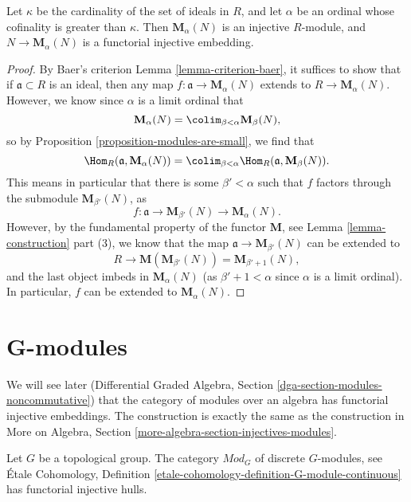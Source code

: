 \begin{theorem}
\label{theorem-baer-grothendieck}
Let $\kappa$ be the cardinality of the set of ideals in $R$, and
let $\alpha$ be an ordinal whose cofinality is greater than
$\kappa$. Then $\mathbf{M}_\alpha(N)$ is an injective $R$-module,
and $N \to \mathbf{M}_\alpha(N)$ is a functorial injective embedding.
\end{theorem}

\begin{proof}
By Baer's criterion
Lemma \ref{lemma-criterion-baer},
it suffices to show that if $\mathfrak{a} \subset R$ is an ideal, then
any map $f : \mathfrak{a} \to \mathbf{M}_\alpha(N)$ extends to
$R \to \mathbf{M}_\alpha(N)$. However, we know since $\alpha$ is a limit
ordinal that
$$
\mathbf{M}_{\alpha}(N) =
\colim_{\beta < \alpha} \mathbf{M}_{\beta}(N),
$$
so by
Proposition \ref{proposition-modules-are-small},
we find that
$$
\Hom_R(\mathfrak{a}, \mathbf{M}_{\alpha}(N)) =
\colim_{\beta < \alpha} \Hom_R(\mathfrak a, \mathbf{M}_{\beta}(N)).
$$
This means in particular that there is some $\beta' < \alpha$
such that $f$ factors through the submodule $\mathbf{M}_{\beta'}(N)$, as
$$
f : \mathfrak{a} \to \mathbf{M}_{\beta'}(N) \to
\mathbf{M}_{\alpha}(N).
$$
However, by the fundamental property of the functor $\mathbf{M}$,
see Lemma \ref{lemma-construction} part (3),
we know that the map $\mathfrak{a} \to \mathbf{M}_{\beta'}(N)$
can be extended to
$$
R \to \mathbf{M}( \mathbf{M}_{\beta'}(N)) =
\mathbf{M}_{\beta' + 1}(N),
$$
and the last object imbeds in $\mathbf{M}_{\alpha}(N)$ (as
$\beta' + 1 < \alpha$ since $\alpha$ is a limit ordinal).
In particular, $f$ can be extended to $\mathbf{M}_{\alpha}(N)$.
\end{proof}




\section{G-modules}
\label{section-G-modules}

\noindent
We will see later
(Differential Graded Algebra, Section \ref{dga-section-modules-noncommutative})
that the category of modules over an algebra has
functorial injective embeddings. The construction is exactly the same
as the construction in
More on Algebra, Section \ref{more-algebra-section-injectives-modules}.

\begin{lemma}
\label{lemma-G-modules}
Let $G$ be a topological group.
The category $\textit{Mod}_G$ of discrete $G$-modules, see
\'Etale Cohomology, Definition
\ref{etale-cohomology-definition-G-module-continuous}
has functorial injective hulls.
\end{lemma}


